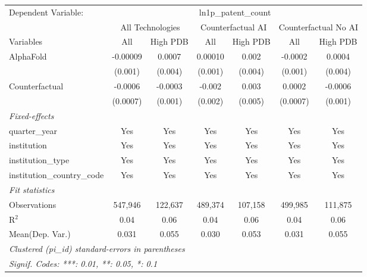 \begingroup
\centering
\begin{tabular}{lcccccc}
   \tabularnewline \midrule \midrule
   Dependent Variable: & \multicolumn{6}{c}{ln1p\_patent\_count}\\
 & \multicolumn{2}{c}{All Technologies} & \multicolumn{2}{c}{Counterfactual AI} & \multicolumn{2}{c}{Counterfactual No AI} \\
\cmidrule(lr){1-1}\cmidrule(lr){2-3} \cmidrule(lr){4-5} \cmidrule(lr){6-7}
Variables & \multicolumn{1}{c}{All} & \multicolumn{1}{c}{High PDB} & \multicolumn{1}{c}{All} & \multicolumn{1}{c}{High PDB} & \multicolumn{1}{c}{All} & \multicolumn{1}{c}{High PDB} \\
\cmidrule(lr){1-1}\cmidrule(lr){2-2} \cmidrule(lr){3-3} \cmidrule(lr){4-4} \cmidrule(lr){5-5} \cmidrule(lr){6-6} \cmidrule(lr){7-7}
   AlphaFold                    & -0.00009 & 0.0007  & 0.00010 & 0.002   & -0.0002  & 0.0004\\   
                                & (0.001)  & (0.004) & (0.001) & (0.004) & (0.001)  & (0.004)\\   
   Counterfactual               & -0.0006  & -0.0003 & -0.002  & 0.003   & 0.0002   & -0.0006\\   
                                & (0.0007) & (0.001) & (0.002) & (0.005) & (0.0007) & (0.001)\\   
   \midrule
   \emph{Fixed-effects}\\
   quarter\_year                & Yes      & Yes     & Yes     & Yes     & Yes      & Yes\\  
   institution                  & Yes      & Yes     & Yes     & Yes     & Yes      & Yes\\  
   institution\_type            & Yes      & Yes     & Yes     & Yes     & Yes      & Yes\\  
   institution\_country\_code   & Yes      & Yes     & Yes     & Yes     & Yes      & Yes\\  
   \midrule
   \emph{Fit statistics}\\
   Observations                 & 547,946  & 122,637 & 489,374 & 107,158 & 499,985  & 111,875\\  
   R$^2$                        & 0.04     & 0.06    & 0.04    & 0.06    & 0.04     & 0.06\\  
Mean(Dep. Var.) & 0.031 & 0.055 & 0.030 & 0.053 & 0.031 & 0.055 \\
   \midrule \midrule
   \multicolumn{7}{l}{\emph{Clustered (pi\_id) standard-errors in parentheses}}\\
   \multicolumn{7}{l}{\emph{Signif. Codes: ***: 0.01, **: 0.05, *: 0.1}}\\
\end{tabular}
\par\endgroup
